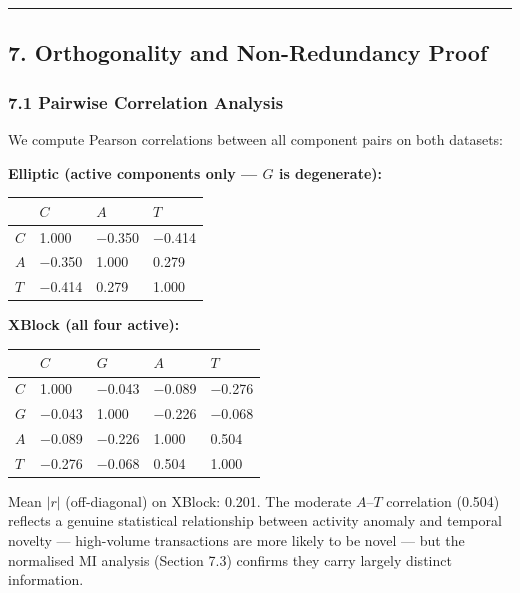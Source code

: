 \documentclass[
  11pt,
]{article}
\newcounter{none} %
\begin{document}
\begin{center}\rule{0.5\linewidth}{0.5pt}\end{center}

\subsection{7. Orthogonality and Non-Redundancy
Proof}\label{orthogonality-and-non-redundancy-proof}

\subsubsection{7.1 Pairwise Correlation
Analysis}\label{pairwise-correlation-analysis}

We compute Pearson correlations between all component pairs on both
datasets:

\textbf{Elliptic (active components only — \(G\) is degenerate):}

{\def\LTcaptype{none} %
\begin{longtable}[]{@{}llll@{}}
\toprule\noalign{}
& \(C\) & \(A\) & \(T\) \\
\midrule\noalign{}
\endhead
\bottomrule\noalign{}
\endlastfoot
\(C\) & 1.000 & −0.350 & −0.414 \\
\(A\) & −0.350 & 1.000 & 0.279 \\
\(T\) & −0.414 & 0.279 & 1.000 \\
\end{longtable}
}

\textbf{XBlock (all four active):}

{\def\LTcaptype{none} %
\begin{longtable}[]{@{}lllll@{}}
\toprule\noalign{}
& \(C\) & \(G\) & \(A\) & \(T\) \\
\midrule\noalign{}
\endhead
\bottomrule\noalign{}
\endlastfoot
\(C\) & 1.000 & −0.043 & −0.089 & −0.276 \\
\(G\) & −0.043 & 1.000 & −0.226 & −0.068 \\
\(A\) & −0.089 & −0.226 & 1.000 & 0.504 \\
\(T\) & −0.276 & −0.068 & 0.504 & 1.000 \\
\end{longtable}
}

Mean \(|r|\) (off-diagonal) on XBlock: 0.201. The moderate \(A\)–\(T\)
correlation (0.504) reflects a genuine statistical relationship between
activity anomaly and temporal novelty — high-volume transactions are
more likely to be novel — but the normalised MI analysis (Section 7.3)
confirms they carry largely distinct information.
\end{document}
